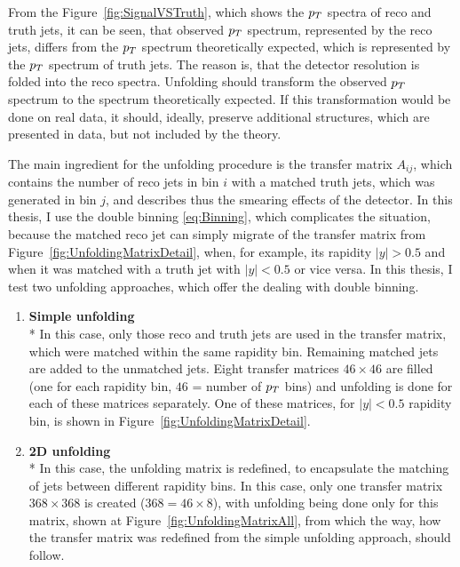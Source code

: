 From the Figure~\ref{fig:SignalVSTruth}, which shows the $p_{T}$ spectra of reco and
truth jets, it can be seen, that observed $p_{T}$ spectrum, represented by the reco jets,
differs from the $p_{T}$ spectrum theoretically expected, which is represented by
the $p_{T}$ spectrum of truth jets. The reason is, that the detector resolution is
folded into the reco spectra. Unfolding should transform the observed $p_{T}$
spectrum to the spectrum theoretically expected. If this transformation would be
done on real data, it should, ideally, preserve additional structures, which are
presented in data, but not included by the theory.

The main ingredient for the unfolding procedure is the transfer matrix $A_{ij}$,
which contains the number of reco jets in bin $i$ with a matched truth jets,
which was generated in bin $j$, and describes thus the smearing effects of the
detector. In this thesis, I use the double binning \eqref{eq:Binning}, which
complicates the situation, because the matched reco jet can simply migrate of the
transfer matrix from Figure~\ref{fig:UnfoldingMatrixDetail}, when, for example,
its rapidity $|y|>0.5$ and when it was matched with a truth jet with $|y|<0.5$ or
vice versa. In this thesis, I test two unfolding approaches, which offer
the dealing with double binning.

\begin{enumerate}
  \item \textbf{Simple unfolding}
  \\*
    In this case, only those reco and truth jets are used in the transfer
    matrix, which were matched within the same rapidity bin. Remaining matched
    jets are added to the unmatched jets. Eight transfer matrices $46 \times
    46$ are filled (one for each rapidity bin, $46$ = number of $p_{T}$ bins) and
    unfolding is done for each of these matrices separately. One of these
    matrices, for $|y|<0.5$ rapidity bin, is shown in
    Figure~\ref{fig:UnfoldingMatrixDetail}.

  \item \textbf{2D unfolding}
  \\*
    In this case, the unfolding matrix is redefined, to encapsulate the matching
    of jets between different rapidity bins. In this case, only one transfer
    matrix $368 \times 368$ is created ($368 = 46 \times 8$), with unfolding being
    done only for this matrix, shown at Figure~\ref{fig:UnfoldingMatrixAll}, from which
    the way, how the transfer matrix was redefined from the simple unfolding
    approach, should follow. 
\end{enumerate}

